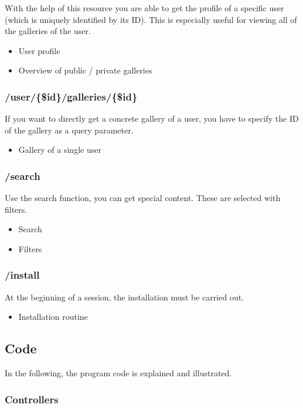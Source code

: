 \documentclass[a4paper,12pt,oneside]{article} %
\begin{document}
With the help of this resource you are able to get the profile of
a specific user (which is uniquely identified by its ID). This is
especially useful for viewing all of the galleries of the user.
\begin{itemize}
\item User profile 
\item Overview of public / private galleries
\end{itemize}

\subsubsection{/user/\{\$id\}/galleries/\{\$id\}}

If you want to directly get a concrete gallery of a user, you have
to specify the ID of the gallery as a query parameter.
\begin{itemize}
\item Gallery of a single user
\end{itemize}

\subsubsection{/search}

Use the search function, you can get special content. These are selected
with filters.
\begin{itemize}
\item Search
\item Filters
\end{itemize}

\subsubsection{/install}

At the beginning of a session, the installation must be carried out.
\begin{itemize}
\item Installation routine
\end{itemize}

\subsection{Code}

In the following, the program code is explained and illustrated.


\subsubsection{Controllers}
\end{document}
